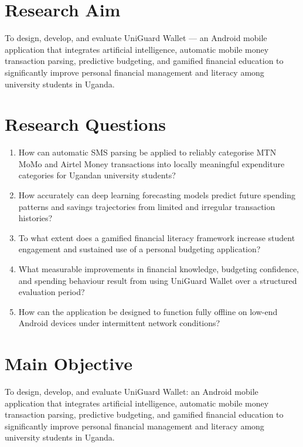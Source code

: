 \documentclass[12pt]{report}
\begin{document}
\section{Research Aim}

To design, develop, and evaluate UniGuard Wallet --- an Android mobile application
that integrates artificial intelligence, automatic mobile money transaction parsing,
predictive budgeting, and gamified financial education to significantly improve personal
financial management and literacy among university students in Uganda.

\section{Research Questions}

\begin{enumerate}
    \item How can automatic SMS parsing be applied to reliably categorise MTN MoMo and Airtel Money transactions into locally meaningful expenditure categories for Ugandan university students?
    \item How accurately can deep learning forecasting models predict future spending patterns and savings trajectories from limited and irregular transaction histories?
    \item To what extent does a gamified financial literacy framework increase student engagement and sustained use of a personal budgeting application?
    \item What measurable improvements in financial knowledge, budgeting confidence, and spending behaviour result from using UniGuard Wallet over a structured evaluation period?
    \item How can the application be designed to function fully offline on low-end Android devices under intermittent network conditions?
\end{enumerate}

\section{Main Objective}

To design, develop, and evaluate UniGuard Wallet: an Android mobile application that
integrates artificial intelligence, automatic mobile money transaction parsing, predictive
budgeting, and gamified financial education to significantly improve personal financial
management and literacy among university students in Uganda.
\end{document}
